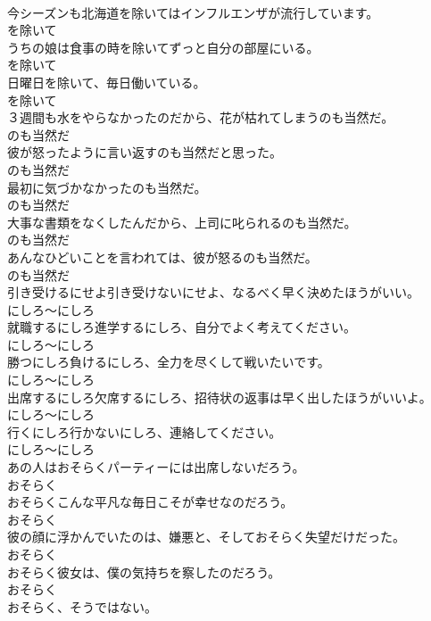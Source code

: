 \documentclass[8pt]{extreport}
\begin{document}
\begin{CJK}{UTF8}{min}
\\	今シーズンも北海道を除いてはインフルエンザが流行しています。	
\\	を除いて
\\	うちの娘は食事の時を除いてずっと自分の部屋にいる。	
\\	を除いて
\\	日曜日を除いて、毎日働いている。	
\\	を除いて
\\	３週間も水をやらなかったのだから、花が枯れてしまうのも当然だ。	
\\	のも当然だ
\\	彼が怒ったように言い返すのも当然だと思った。	
\\	のも当然だ
\\	最初に気づかなかったのも当然だ。	
\\	のも当然だ
\\	大事な書類をなくしたんだから、上司に叱られるのも当然だ。	
\\	のも当然だ
\\	あんなひどいことを言われては、彼が怒るのも当然だ。	
\\	のも当然だ
\\	引き受けるにせよ引き受けないにせよ、なるべく早く決めたほうがいい。	
\\	にしろ～にしろ
\\	就職するにしろ進学するにしろ、自分でよく考えてください。	
\\	にしろ～にしろ
\\	勝つにしろ負けるにしろ、全力を尽くして戦いたいです。	
\\	にしろ～にしろ
\\	出席するにしろ欠席するにしろ、招待状の返事は早く出したほうがいいよ。	
\\	にしろ～にしろ
\\	行くにしろ行かないにしろ、連絡してください。	
\\	にしろ～にしろ
\\	あの人はおそらくパーティーには出席しないだろう。	
\\	おそらく
\\	おそらくこんな平凡な毎日こそが幸せなのだろう。	
\\	おそらく
\\	彼の顔に浮かんでいたのは、嫌悪と、そしておそらく失望だけだった。	
\\	おそらく
\\	おそらく彼女は、僕の気持ちを察したのだろう。	
\\	おそらく
\\	おそらく、そうではない。	

\end{CJK}
\end{document}
